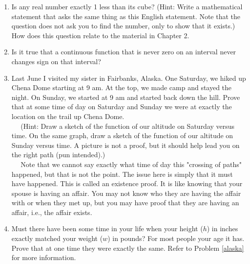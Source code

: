 \begin{enumerate}
\item  Is any real number exactly 1 less than its cube?  (Hint:  Write a mathematical statement that asks the same thing as this English statement.  Note that the question does not ask you to find the number, only to show that it exists.)  How does this question relate to the material in Chapter 2. 

\item  Is it true that a continuous function that is never zero on an interval never changes sign on that interval?  \cite{FWG} 

\item  \label{alaska} Last June I visited my sister in Fairbanks, Alaska.  One Saturday, we hiked up Chena Dome starting at 9 am.  At the top, we made camp and stayed the night.  On Sunday, we started at 9 am and started back down the hill.  Prove that at some time of day on Saturday and Sunday we were at exactly the location on the trail up Chena Dome.\\ 
	$\mbox{}\ \ \ \ \ \ $(Hint:  Draw a sketch of the function of our altitude on Saturday versus time.  On the same graph, draw a sketch of the function of our altitude on Sunday versus time.  A picture is not a proof, but it should help lead you on the right path (pun intended).)\\ 
	$\mbox{}\ \ \ \ \ \ $Note that we cannot say exactly what time of day this "crossing of paths" happened, but that is not the point.  The issue here is simply that it must have happened.  This is called an existence proof.  It is like knowing that your spouse is having an affair.  You may not know who they are having the affair with or when they met up, but you may have proof that they are having an affair, i.e., the affair exists. 

\item  Must there have been some time in your life when your height ($h$) in inches exactly matched your weight ($w$) in pounds?  For most people your age it has.  Prove that at one time they were exactly the same.   Refer to Problem \ref{alaska} for more information. 


\end{enumerate}
